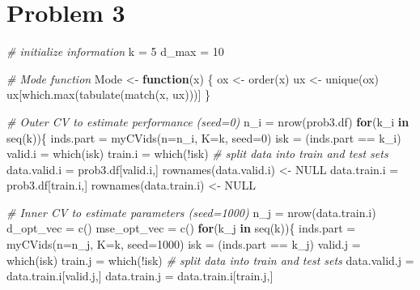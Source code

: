 \documentclass[
  11pt,
]{article}
\newenvironment{Shaded}{\begin{snugshade}}{\end{snugshade}}
\newcommand{\AttributeTok}[1]{\textcolor[rgb]{0.77,0.63,0.00}{#1}}
\newcommand{\CommentTok}[1]{\textcolor[rgb]{0.56,0.35,0.01}{\textit{#1}}}
\newcommand{\ConstantTok}[1]{\textcolor[rgb]{0.00,0.00,0.00}{#1}}
\newcommand{\ControlFlowTok}[1]{\textcolor[rgb]{0.13,0.29,0.53}{\textbf{#1}}}
\newcommand{\DecValTok}[1]{\textcolor[rgb]{0.00,0.00,0.81}{#1}}
\newcommand{\FunctionTok}[1]{\textcolor[rgb]{0.00,0.00,0.00}{#1}}
\newcommand{\NormalTok}[1]{#1}
\newcommand{\OtherTok}[1]{\textcolor[rgb]{0.56,0.35,0.01}{#1}}
\newcommand{\SpecialCharTok}[1]{\textcolor[rgb]{0.00,0.00,0.00}{#1}}
\begin{document}
\hypertarget{problem-3}{%
\section{Problem 3}\label{problem-3}}

\begin{Shaded}
\begin{Highlighting}[]
\CommentTok{\# initialize information}
\NormalTok{k }\OtherTok{=} \DecValTok{5}
\NormalTok{d\_max }\OtherTok{=} \DecValTok{10}

\CommentTok{\# Mode function}
\NormalTok{Mode }\OtherTok{\textless{}{-}} \ControlFlowTok{function}\NormalTok{(x) \{}
\NormalTok{  ox }\OtherTok{\textless{}{-}} \FunctionTok{order}\NormalTok{(x)}
\NormalTok{  ux }\OtherTok{\textless{}{-}} \FunctionTok{unique}\NormalTok{(ox)}
\NormalTok{  ux[}\FunctionTok{which.max}\NormalTok{(}\FunctionTok{tabulate}\NormalTok{(}\FunctionTok{match}\NormalTok{(x, ux)))]}
\NormalTok{\}}

\CommentTok{\# Outer CV to estimate performance (seed=0)}
\NormalTok{n\_i }\OtherTok{=} \FunctionTok{nrow}\NormalTok{(prob3.df)}
\ControlFlowTok{for}\NormalTok{(k\_i }\ControlFlowTok{in} \FunctionTok{seq}\NormalTok{(k))\{}
\NormalTok{  inds.part }\OtherTok{=} \FunctionTok{myCVids}\NormalTok{(}\AttributeTok{n=}\NormalTok{n\_i, }\AttributeTok{K=}\NormalTok{k, }\AttributeTok{seed=}\DecValTok{0}\NormalTok{)}
\NormalTok{  isk }\OtherTok{=}\NormalTok{ (inds.part }\SpecialCharTok{==}\NormalTok{ k\_i)}
\NormalTok{  valid.i }\OtherTok{=} \FunctionTok{which}\NormalTok{(isk)}
\NormalTok{  train.i }\OtherTok{=} \FunctionTok{which}\NormalTok{(}\SpecialCharTok{!}\NormalTok{isk)}
  \CommentTok{\# split data into train and test sets}
\NormalTok{  data.valid.i }\OtherTok{=}\NormalTok{ prob3.df[valid.i,]}
  \FunctionTok{rownames}\NormalTok{(data.valid.i) }\OtherTok{\textless{}{-}} \ConstantTok{NULL}
\NormalTok{  data.train.i }\OtherTok{=}\NormalTok{ prob3.df[train.i,]}
  \FunctionTok{rownames}\NormalTok{(data.train.i) }\OtherTok{\textless{}{-}} \ConstantTok{NULL}
  
  \CommentTok{\# Inner CV to estimate parameters (seed=1000)}
\NormalTok{  n\_j }\OtherTok{=} \FunctionTok{nrow}\NormalTok{(data.train.i)}
\NormalTok{  d\_opt\_vec }\OtherTok{=} \FunctionTok{c}\NormalTok{()}
\NormalTok{  mse\_opt\_vec }\OtherTok{=} \FunctionTok{c}\NormalTok{()}
  \ControlFlowTok{for}\NormalTok{(k\_j }\ControlFlowTok{in} \FunctionTok{seq}\NormalTok{(k))\{}
\NormalTok{    inds.part }\OtherTok{=} \FunctionTok{myCVids}\NormalTok{(}\AttributeTok{n=}\NormalTok{n\_j, }\AttributeTok{K=}\NormalTok{k, }\AttributeTok{seed=}\DecValTok{1000}\NormalTok{)}
\NormalTok{    isk }\OtherTok{=}\NormalTok{ (inds.part }\SpecialCharTok{==}\NormalTok{ k\_j)}
\NormalTok{    valid.j }\OtherTok{=} \FunctionTok{which}\NormalTok{(isk)}
\NormalTok{    train.j }\OtherTok{=} \FunctionTok{which}\NormalTok{(}\SpecialCharTok{!}\NormalTok{isk)}
    \CommentTok{\# split data into train and test sets}
\NormalTok{    data.valid.j }\OtherTok{=}\NormalTok{ data.train.i[valid.j,]}
\NormalTok{    data.train.j }\OtherTok{=}\NormalTok{ data.train.i[train.j,]}


\end{Highlighting}
\end{Shaded}
\end{document}
